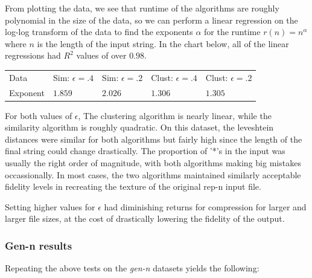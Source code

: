 \documentclass[11pt]{article}
\begin{document}
From plotting the data, we see that runtime of the algorithms are roughly polynomial
in the size of the data, so we can perform a linear regression on the log-log transform
of the data to find the exponents $\alpha$ for the runtime $r(n)=n^\alpha$ where $n$ is the
length of the input string. In the chart below, all of the linear regressions had
$R^2$ values of over $0.98$.

\begin{tabular}{l|l|l|l|l}
Data     & Sim: $\epsilon=.4$ & Sim: $\epsilon=.2$ & Clust: $\epsilon = .4$ & Clust: $\epsilon = .2$ \\
Exponent & $1.859$ & $2.026$ & $1.306$ & $1.305$
\end{tabular}


For both values of $\epsilon$, 
The clustering algorithm is nearly linear, while the similarity algorithm is roughly
quadratic. On this dataset, the leveshtein distances were similar for both algorithms
but fairly high since the length of the final string could change drastically.
The proportion of '*'s in the input was usually the right order of magnitude,
with both algorithms making big mistakes occassionally. In most cases,
the two algorithms maintained similarly acceptable fidelity levels in recreating
the texture of the original rep-n input file.

Setting higher values for $\epsilon$ had diminishing returns for compression
for larger and larger file sizes, at the cost of drastically lowering the fidelity
of the output. 

\subsubsection{Gen-n results}

Repeating the above tests on the \emph{gen-n} datasets yields the following:
\end{document}
